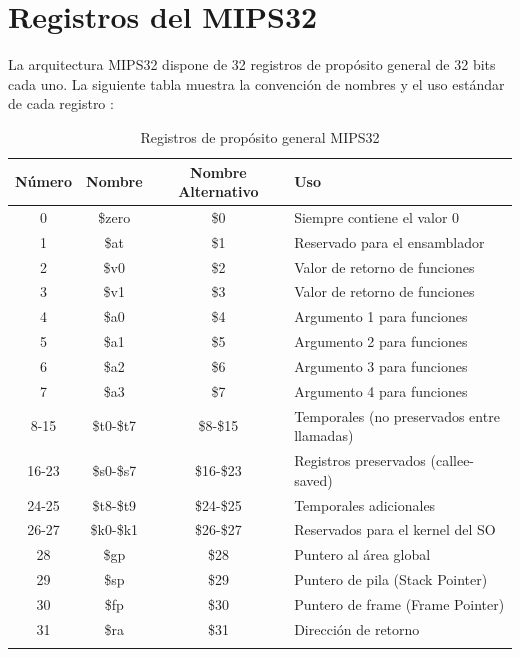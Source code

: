 \documentclass[12pt]{article}
\begin{document}
\section{Registros del MIPS32}

La arquitectura MIPS32 dispone de 32 registros de propósito general de 32 bits cada uno. La siguiente tabla muestra la convención de nombres y el uso estándar de cada registro \cite{spimref}:

\begin{longtable}{|c|c|c|p{5cm}|}
    \hline
    \textbf{Número} & \textbf{Nombre} & \textbf{Nombre Alternativo} & \textbf{Uso} \\
    \hline
    0 & \$zero & \$0 & Siempre contiene el valor 0 \\
    \hline
    1 & \$at & \$1 & Reservado para el ensamblador \\
    \hline
    2 & \$v0 & \$2 & Valor de retorno de funciones \\
    \hline
    3 & \$v1 & \$3 & Valor de retorno de funciones \\
    \hline
    4 & \$a0 & \$4 & Argumento 1 para funciones \\
    \hline
    5 & \$a1 & \$5 & Argumento 2 para funciones \\
    \hline
    6 & \$a2 & \$6 & Argumento 3 para funciones \\
    \hline
    7 & \$a3 & \$7 & Argumento 4 para funciones \\
    \hline
    8-15 & \$t0-\$t7 & \$8-\$15 & Temporales (no preservados entre llamadas) \\
    \hline
    16-23 & \$s0-\$s7 & \$16-\$23 & Registros preservados (callee-saved) \\
    \hline
    24-25 & \$t8-\$t9 & \$24-\$25 & Temporales adicionales \\
    \hline
    26-27 & \$k0-\$k1 & \$26-\$27 & Reservados para el kernel del SO \\
    \hline
    28 & \$gp & \$28 & Puntero al área global \\
    \hline
    29 & \$sp & \$29 & Puntero de pila (Stack Pointer) \\
    \hline
    30 & \$fp & \$30 & Puntero de frame (Frame Pointer) \\
    \hline
    31 & \$ra & \$31 & Dirección de retorno \\
    \hline
    \caption{Registros de propósito general MIPS32 \cite{regusage}}
    \label{tab:registros}
\end{longtable}
\end{document}
